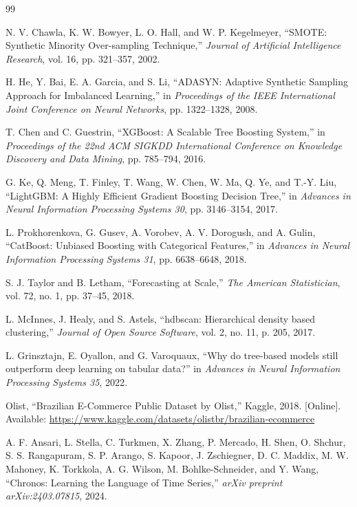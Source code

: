 \documentclass[12pt,a4paper]{report}
\begin{document}
\begin{thebibliography}{99}

N. V. Chawla, K. W. Bowyer, L. O. Hall, and W. P. Kegelmeyer, ``SMOTE: Synthetic Minority Over-sampling Technique,'' \textit{Journal of Artificial Intelligence Research}, vol. 16, pp. 321--357, 2002.

H. He, Y. Bai, E. A. Garcia, and S. Li, ``ADASYN: Adaptive Synthetic Sampling Approach for Imbalanced Learning,'' in \textit{Proceedings of the IEEE International Joint Conference on Neural Networks}, pp. 1322--1328, 2008.

T. Chen and C. Guestrin, ``XGBoost: A Scalable Tree Boosting System,'' in \textit{Proceedings of the 22nd ACM SIGKDD International Conference on Knowledge Discovery and Data Mining}, pp. 785--794, 2016.

G. Ke, Q. Meng, T. Finley, T. Wang, W. Chen, W. Ma, Q. Ye, and T.-Y. Liu, ``LightGBM: A Highly Efficient Gradient Boosting Decision Tree,'' in \textit{Advances in Neural Information Processing Systems 30}, pp. 3146--3154, 2017.

L. Prokhorenkova, G. Gusev, A. Vorobev, A. V. Dorogush, and A. Gulin, ``CatBoost: Unbiased Boosting with Categorical Features,'' in \textit{Advances in Neural Information Processing Systems 31}, pp. 6638--6648, 2018.

S. J. Taylor and B. Letham, ``Forecasting at Scale,'' \textit{The American Statistician}, vol. 72, no. 1, pp. 37--45, 2018.

L. McInnes, J. Healy, and S. Astels, ``hdbscan: Hierarchical density based clustering,'' \textit{Journal of Open Source Software}, vol. 2, no. 11, p. 205, 2017.

L. Grinsztajn, E. Oyallon, and G. Varoquaux, ``Why do tree-based models still outperform deep learning on tabular data?'' in \textit{Advances in Neural Information Processing Systems 35}, 2022.

Olist, ``Brazilian E-Commerce Public Dataset by Olist,'' Kaggle, 2018. [Online]. Available: \url{https://www.kaggle.com/datasets/olistbr/brazilian-ecommerce}

A. F. Ansari, L. Stella, C. Turkmen, X. Zhang, P. Mercado, H. Shen, O. Shchur, S. S. Rangapuram, S. P. Arango, S. Kapoor, J. Zschiegner, D. C. Maddix, M. W. Mahoney, K. Torkkola, A. G. Wilson, M. Bohlke-Schneider, and Y. Wang, ``Chronos: Learning the Language of Time Series,'' \textit{arXiv preprint arXiv:2403.07815}, 2024.

\end{thebibliography}
\end{document}
